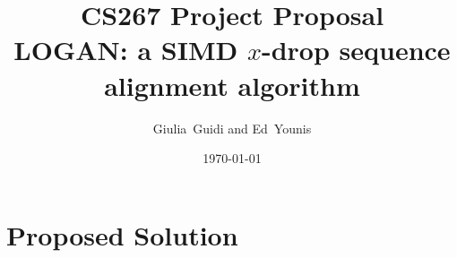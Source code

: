 \documentclass[11pt,onecolumn]{article}
\title{CS267 Project Proposal \\ LOGAN: a SIMD $x$-drop sequence alignment algorithm
}
\author{Giulia~Guidi and Ed~Younis}
\date{
\today\\
}
\begin{document}
\maketitle

\section*{Proposed Solution}



\end{document}
